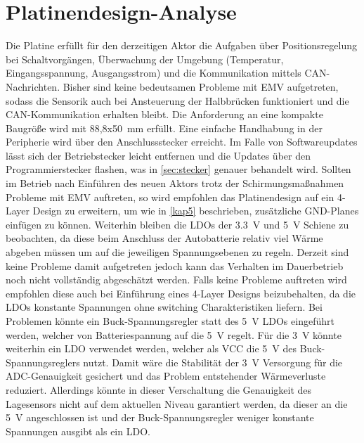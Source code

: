 \section{Platinendesign-Analyse}\label{sec:platan}
Die Platine erfüllt für den derzeitigen Aktor die Aufgaben über Positionsregelung bei Schaltvorgängen, Überwachung der Umgebung (Temperatur, Eingangsspannung, Ausgangsstrom) und die Kommunikation mittels CAN-Nachrichten. Bisher sind keine bedeutsamen Probleme mit EMV aufgetreten, sodass die Sensorik auch bei Ansteuerung der Halbbrücken funktioniert und die CAN-Kommunikation erhalten bleibt. Die Anforderung an eine kompakte Baugröße wird mit 88,8x\SI{50}{mm} erfüllt. Eine einfache Handhabung in der Peripherie wird über den Anschlussstecker erreicht. Im Falle von Softwareupdates lässt sich der Betriebstecker leicht entfernen und die Updates über den Programmierstecker flashen, was in \autoref{sec:stecker} genauer behandelt wird. Sollten im Betrieb nach Einführen des neuen Aktors trotz der Schirmungsmaßnahmen Probleme mit EMV auftreten, so wird empfohlen das Platinendesign auf ein 4-Layer Design zu erweitern, um wie in \autoref{kap5} beschrieben, zusätzliche GND-Planes einfügen zu können. Weiterhin bleiben die LDOs der \SI{3,3}{V} und \SI{5}{V} Schiene zu beobachten, da diese beim Anschluss der Autobatterie relativ viel Wärme abgeben müssen um auf die jeweiligen Spannungsebenen zu regeln. Derzeit sind keine Probleme damit aufgetreten jedoch kann das Verhalten im Dauerbetrieb noch nicht vollständig abgeschätzt werden. Falls keine Probleme auftreten wird empfohlen diese auch bei Einführung eines 4-Layer Designs beizubehalten, da die LDOs konstante Spannungen ohne switching Charakteristiken liefern. Bei Problemen könnte ein Buck-Spannungsregler statt des \SI{5}{V} LDOs eingeführt werden, welcher von Batteriespannung auf die \SI{5}{V} regelt. Für die \SI{3}{V} könnte weiterhin ein LDO verwendet werden, welcher als VCC die \SI{5}{V} des Buck-Spannungsreglers nutzt. Damit wäre die Stabilität der \SI{3}{V} Versorgung für die ADC-Genauigkeit gesichert und das Problem entstehender Wärmeverluste reduziert. Allerdings könnte in dieser Verschaltung die Genauigkeit des Lagesensors nicht auf dem aktuellen Niveau garantiert werden, da dieser an die \SI{5}{V} angeschlossen ist und der Buck-Spannungsregler weniger konstante Spannungen ausgibt als ein LDO. 


